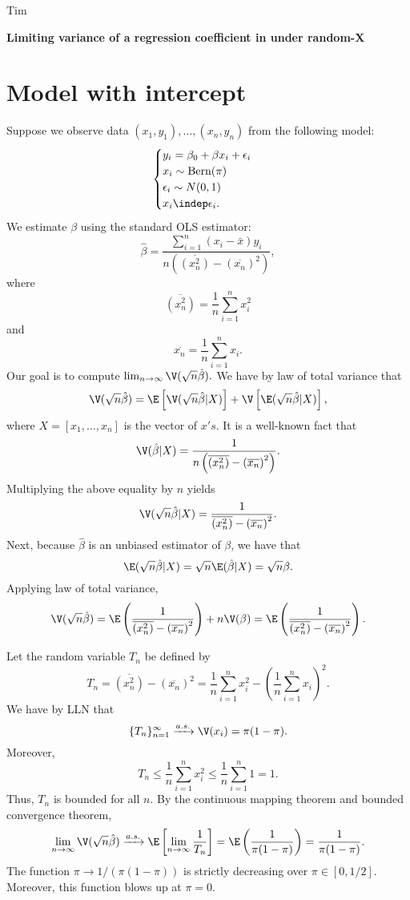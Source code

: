 \documentclass[12pt]{article}
\begin{document}
\noindent	
Tim
\begin{center}
\textbf{Limiting variance of a regression coefficient in under random-X}
\end{center}

\section{Model with intercept}

\noindent
Suppose we observe data $(x_1, y_1), \dots, (x_n, y_n)$ from the following model:
$$
\begin{cases}
y_i = \beta_0 + \beta x_i + \epsilon_i \\
x_i \sim \textrm{Bern}(\pi) \\
\epsilon_i \sim N(0,1) \\
x_i \indep \epsilon _i.
\end{cases}
$$
We estimate $\beta$ using the standard OLS estimator:
$$\hat{\beta} = \frac{ \sum_{i=1}^n (x_i - \bar{x}) y_i }{ n \left( \overline{(x^2_n)} - \left( \overline{x_n} \right)^2  \right)},$$
where 
$$\overline{(x^2_n)} = \frac{1}{n}\sum_{i=1}^n x_i^2$$ and $$ \overline{x_n} = \frac{1}{n} \sum_{i=1}^n x_i.$$ Our goal is to compute $\lim_{n\to\infty} \V( \sqrt{n} \hat{\beta}).$ We have by law of total variance that
$$\V(\sqrt{n} \hat{\beta}) = \E\left[ \V(\sqrt{n}\hat{\beta} | X ) \right] + \V \left[ \E ( \sqrt{n} \hat{\beta}|X) \right],$$ where $X = [x_1, \dots, x_n]$ is the vector of $x's$. It is a well-known fact that
$$ \V(\hat{\beta} | X) = \frac{ 1 }{n \left( \overline{(x^2_n)} - \left( \overline{x_n} \right)^2  \right)}.$$ Multiplying the above equality by $n$ yields $$\V( \sqrt{n} \hat{\beta} | X ) = \frac{1}{\overline{(x^2_n)} - \left( \overline{x_n} \right)^2}.$$ Next, because $\hat{\beta}$ is an unbiased estimator of $\beta$, we have that
$$ \E( \sqrt{n} \hat{\beta} | X ) = \sqrt{n} \E(\hat{\beta}|X)  = \sqrt{n} \beta.$$ Applying law of total variance,
$$\V(\sqrt{n}\hat{\beta}) = \E \left(\frac{1}{\overline{(x^2_n)} - \left( \overline{x_n} \right)^2} \right) + n \V(\beta) = \E \left(\frac{1}{\overline{(x^2_n)} - \left( \overline{x_n} \right)^2} \right) .$$

Let the random variable $T_n$ be defined by
$$T_n = \overline{ (x_n^2)} - (\overline{x_n})^2 = \frac{1}{n}\sum_{i=1}^n x_i^2 - \left(\frac{1}{n} \sum_{i=1}^n x_i \right)^2.$$ We have by LLN that
$$\{ T_n \}_{n=1}^\infty \xrightarrow{a.s.} \V(x_i) = \pi (1-\pi).$$
Moreover, 
$$T_n \leq \frac{1}{n} \sum_{i=1}^n x_i^2 \leq \frac{1}{n} \sum_{i=1}^n 1 = 1.$$ Thus, $T_n$ is bounded for all $n$. By the continuous mapping theorem and bounded convergence theorem,
$$\lim_{n \to \infty} \V(\sqrt{n} \hat{\beta}) \xrightarrow{a.s.} \E \left[ \lim_{n \to \infty} \frac{1}{T_n} \right] = \E \left( \frac{1}{\pi(1-\pi)}\right) = \frac{1}{\pi(1-\pi)}.$$
The function $\pi \to 1/(\pi(1 - \pi))$ is strictly decreasing over $\pi \in [0,1/2]$. Moreover, this function blows up at $\pi = 0$.
% 
% 
\end{document}
